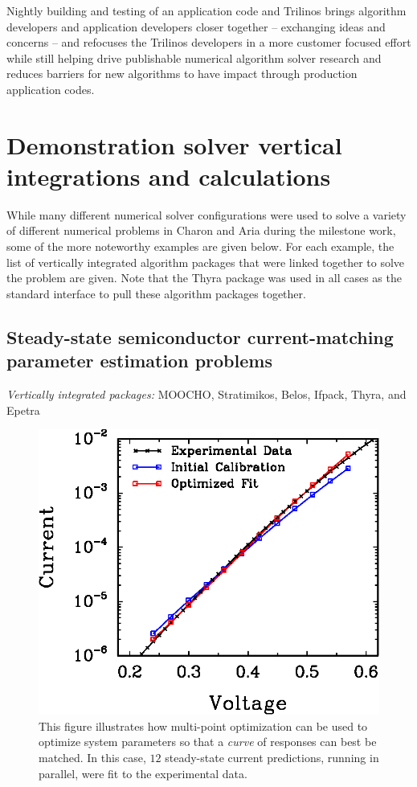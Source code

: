 \documentclass[pdf,ps2pdf,11pt]{SANDreport}
\begin{document}
Nightly building and testing of an application code and Trilinos
brings algorithm developers and application developers closer together --
exchanging ideas and concerns -- and refocuses the Trilinos developers in a more customer focused
effort while still helping drive publishable numerical algorithm solver
research and reduces barriers for new algorithms to have impact through
production application codes.



%
\section{Demonstration solver vertical integrations and calculations}
\label{sec:demonstration}
%

While many different numerical solver configurations were used to solve a
variety of different numerical problems in Charon and Aria during the
milestone work, some of the more noteworthy examples are given below.  For each
example, the list of vertically integrated algorithm packages that were
linked together to solve the problem are given.  Note that the Thyra package
was used in all cases as the standard interface to pull these algorithm
packages together.

%
\subsection{Steady-state semiconductor current-matching parameter
estimation problems}
%

{}\noindent\textit{Vertically integrated packages:} MOOCHO, Stratimikos,
Belos, Ifpack, Thyra, and Epetra

{\bsinglespace
\begin{figure}
\begin{center}
\includegraphics*[angle=0,scale=0.80,width=0.50\linewidth
]{multiPointFit}
\end{center}
\caption[Multipoint current-matching parameter estimation solution against experimental data]{
\label{fig:multiPointFit}
This figure illustrates how multi-point optimization can be used to optimize
system parameters so that a {\em curve} of responses can best be matched. In
this case, $12$ steady-state current predictions, running in parallel, were
fit to the experimental data.}
\end{figure}
\esinglespace}
\end{document}

